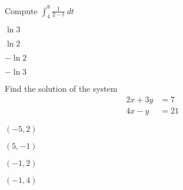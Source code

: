 \begin{readinessAssuranceTest}
\item
Compute \(\int _4 ^8 \frac{1}{2-t}\ dt\)
\begin{multicols}{4}
\begin{readinessAssuranceTestChoices}
\item  \(\ln 3\) %
\item  \(\ln 2\) %
\item  \(-\ln 2\) %
\item  \(-\ln 3\) %
\end{readinessAssuranceTestChoices}
\end{multicols}

\item 
Find the solution of the system
\begin{alignat*}
2x+3y&=7\\
4x-y &= 21
\end{alignat*}
\begin{multicols}{4}
\begin{readinessAssuranceTestChoices}
\item  \((-5,2)\) 
\item  \((5,-1)\) %
\item  \((-1,2)\)
\item  \((-1,4)\) 
\end{readinessAssuranceTestChoices}
\end{multicols}


\end{readinessAssuranceTest}
